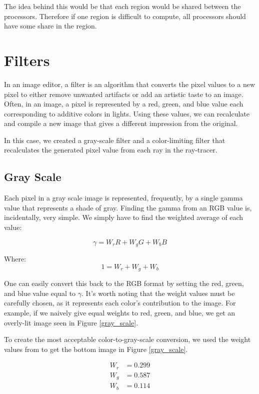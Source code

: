 \documentclass{acmsiggraph}
\begin{document}
The idea behind this would be that each region would be shared between the
processors. Therefore if one region is difficult to compute, all processors
should have some share in the region.

\section{Filters}
In an image editor, a filter is an algorithm that converts the pixel values to
a new pixel to either remove unwanted artifacts or add an artistic taste to an
image.  Often, in an image, a pixel is represented by a red, green, and blue
value each corresponding to additive colors in lights.  Using these values, we
can recalculate and compile a new image that gives a different impression from
the original.

In this case, we created a gray-scale filter and a color-limiting filter that
recalculates the generated pixel value from each ray in the ray-tracer.


\subsection{Gray Scale}
Each pixel in a gray scale image is represented, frequently, by a single gamma
value that represents a shade of gray.  Finding the gamma from an RGB value
is, incidentally, very simple.  We simply have to find the weighted average of
each value:

\begin{equation}
\gamma = W_{r}R + W_{g}G + W_{b}B
\end{equation}

Where:
\begin{equation}
1 = W_{r} + W_{g} + W_{b}
\end{equation}

One can easily convert this back to the RGB format by setting the red, green,
and blue value equal to $\gamma$.  It's worth noting that the weight values
must be carefully chosen, as it represents each color's contribution to the
image.  For example, if we naively give equal weights to red, green, and blue,
we get an overly-lit image seen in Figure \ref{gray_scale}.

To create the most acceptable color-to-gray-scale conversion, we used the
weight values from \cite{mw11ASCU} to get the bottom image in Figure
\ref{gray_scale}.

\begin{align}
W_{r} &= 0.299 \\
W_{g} &= 0.587 \\
W_{b} &= 0.114
\end{align}
\end{document}
